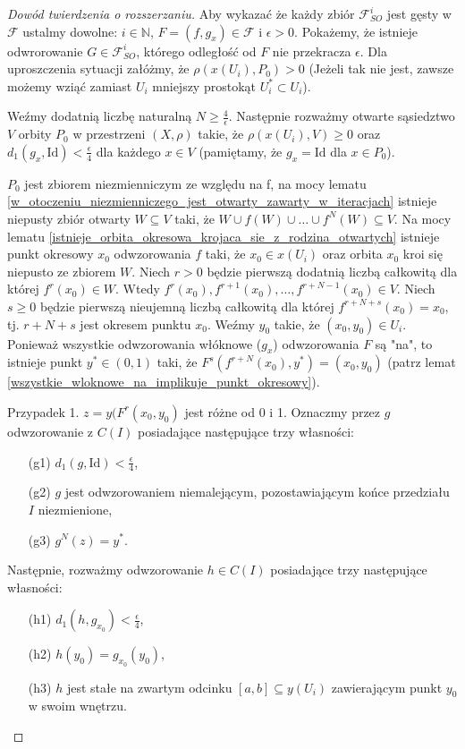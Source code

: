 \documentclass[licencjacka]{pwr_wmat_praca_dyplomowa}
\theoremstyle{plain}
\numberwithin{theorem}{chapter}
\theoremstyle{definition}
\numberwithin{theorem}{chapter}
\begin{document}
\begin{proof}[Dowód twierdzenia o rozszerzaniu]
Aby wykazać że każdy zbiór $\mathcal{F}_{SO}^i$ jest gęsty w $\mathcal{F}$ ustalmy dowolne: $i \in \mathbb{N}$, $F=(f,g_x) \in \mathcal{F}$ i $\epsilon > 0$. Pokażemy, że istnieje odwrorowanie $G \in \mathcal{F}_{SO}^i$, którego odległość od $F$ nie przekracza $\epsilon$. Dla uproszczenia sytuacji załóżmy, że $\rho(x(U_i), P_0) > 0$ (Jeżeli tak nie jest, zawsze możemy wziąć zamiast $U_i$ mniejszy prostokąt $U_i^* \subset U_i$).

Weźmy dodatnią liczbę naturalną $N \geq \frac{4}{\epsilon}$. Następnie rozważmy otwarte sąsiedztwo $V$ orbity $P_0$ w przestrzeni $(X, \rho)$ takie, że $\rho(x(U_i), V) \geq 0$ oraz $d_1(g_x, \textrm{Id}) < \frac{\epsilon}{4}$ dla każdego $x \in V$ (pamiętamy, że $g_x = \textrm{Id}$ dla $x \in P_0$).

$P_0$ jest zbiorem niezmienniczym ze względu na f, na mocy lematu \ref{w_otoczeniu_niezmienniczego_jest_otwarty_zawarty_w_iteracjach} istnieje niepusty zbiór otwarty $W \subseteq V$ taki, że $W \cup f(W) \cup \ldots \cup f^N(W) \subseteq V$. Na mocy lematu \ref{istnieje_orbita_okresowa_krojaca_sie_z_rodzina_otwartych} istnieje punkt okresowy $x_0$ odwzorowania $f$ taki, że $x_0 \in x(U_i)$ oraz orbita $x_0$ kroi się niepusto ze zbiorem $W$. Niech $r > 0$ będzie pierwszą dodatnią liczbą całkowitą dla której $f^r(x_0) \in W$. Wtedy $f^r(x_0), f^{r+1}(x_0), \ldots, f^{r+N-1}(x_0) \in V$. Niech $s \geq 0$ będzie pierwszą nieujemną liczbą całkowitą dla której $f^{r+N+s}(x_0) = x_0$, tj. $r+N+s$ jest okresem punktu $x_0$. Weźmy $y_0$ takie, że $(x_0, y_0) \in U_i$. Ponieważ wszystkie odwzorowania włóknowe ($g_x$) odwzorowania $F$ są "na", to istnieje punkt $y^* \in (0,1)$ taki, że $F^s(f^{r+N}(x_0), y^*) = (x_0, y_0)$ (patrz lemat \ref{wszystkie_wloknowe_na_implikuje_punkt_okresowy}).

Przypadek 1. $z = y(F^r(x_0, y_0)$ jest różne od 0 i 1.
Oznaczmy przez $g$ odwzorowanie z $C(I)$ posiadające następujące trzy własności:
\begin{enumerate}
\item[(g1)] \label{g_jeden} $d_1(g, \mathrm{Id}) < \frac{\epsilon}{4}$,
\item[(g2)] \label{g_dwa} $g$ jest odwzorowaniem niemalejącym, pozostawiającym końce przedziału $I$ niezmienione,
\item[(g3)] \label{g_trzy} $g^N(z) = y^*$.
\end{enumerate}

Następnie, rozważmy odwzorowanie $h \in C(I)$ posiadające trzy następujące własności:
\begin{enumerate}
\item[(h1)] \label{h_jeden} $d_1(h, g_{x_0}) < \frac{\epsilon}{4}$,
\item[(h2)] \label{h_dwa} $h(y_0) = g_{x_0}(y_0)$,
\item[(h3)] \label{h_trzy} $h$ jest stałe na zwartym odcinku $[a,b] \subseteq y(U_i)$ zawierającym punkt $y_0$ w swoim wnętrzu.
\end{enumerate}


\end{proof}
\end{document}
